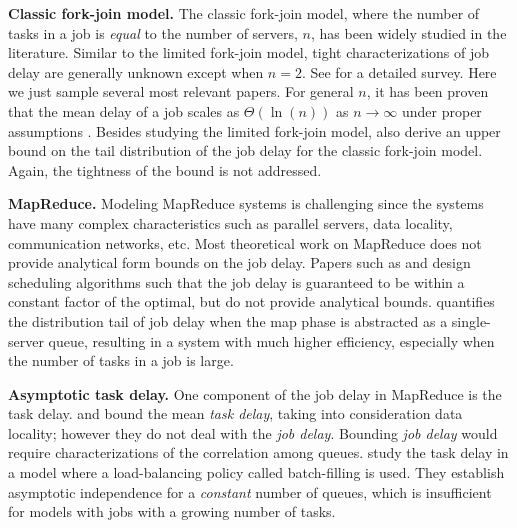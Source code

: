 \documentclass[sigconf]{acmart}
\begin{document}
\textbf{Classic fork-join model.}
The classic fork-join model, where the number of tasks in a job is \emph{equal} to the number of servers, $n$, has been widely studied in the literature.  Similar to the limited fork-join model, tight characterizations of job delay are generally unknown except when $n=2$.  See \cite{Tho_14} for a detailed survey.  Here we just sample several most relevant papers. For general $n$, it has been proven that the mean delay of a job scales as $\Theta(\ln(n))$ as $n\to\infty$ under proper assumptions \cite{NelTan_88,BacMakShw_89}. Besides studying the limited fork-join model, \citet{RizPolCiu_16} also derive an upper bound on the tail distribution of the job delay for the classic fork-join model.  Again, the tightness of the bound is not addressed.




\textbf{MapReduce.}
Modeling MapReduce systems is challenging since the systems have many complex characteristics such as parallel servers, data locality, communication networks, etc. Most theoretical work on MapReduce does not provide analytical form bounds on the job delay. Papers such as \cite{MosDasKum_11,ZheShrSin_13} and \cite{SunKokShr_17} design scheduling algorithms such that the job delay is guaranteed to be within a constant factor of the optimal, but do not provide analytical bounds. \citet{TanMenZha_12} quantifies the distribution tail of job delay when the map phase is abstracted as a single-server queue, resulting in a system with much higher efficiency, especially when the number of tasks in a job is large.  %


\textbf{Asymptotic task delay.}
One component of the job delay in MapReduce is the task delay. \citet{WanZhuYin_16} and \citet{XieLu_15} bound the mean \emph{task delay}, taking into consideration data locality; however they do not deal with the \emph{job delay}. Bounding \emph{job delay} would require characterizations of the correlation among queues.  \citet{YinSriKan_15} study the task delay in a model where a load-balancing policy called batch-filling is used.  They establish asymptotic independence for a \emph{constant} number of queues, which is insufficient for models with jobs with a growing number of tasks.
\end{document}
